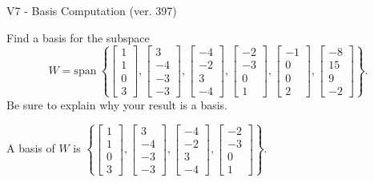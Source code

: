 \begin{exercise}
  \begin{exerciseTitle}V7 - Basis Computation (ver. 397)\end{exerciseTitle}
  \begin{exerciseStatement}
    Find a basis for the subspace 
\[W=\mathrm{span}\ \left\{\left[\begin{array}{r}
1 \\
1 \\
0 \\
3
\end{array}\right] , \left[\begin{array}{r}
3 \\
-4 \\
-3 \\
-3
\end{array}\right] , \left[\begin{array}{r}
-4 \\
-2 \\
3 \\
-4
\end{array}\right] , \left[\begin{array}{r}
-2 \\
-3 \\
0 \\
1
\end{array}\right] , \left[\begin{array}{r}
-1 \\
0 \\
0 \\
2
\end{array}\right] , \left[\begin{array}{r}
-8 \\
15 \\
9 \\
-2
\end{array}\right]\right\}.\]
 Be sure to explain why your result is a basis.


  \end{exerciseStatement}
  \begin{exerciseAnswer}
   A basis of \(W\) is  \(\left\{\left[\begin{array}{r}
1 \\
1 \\
0 \\
3
\end{array}\right] , \left[\begin{array}{r}
3 \\
-4 \\
-3 \\
-3
\end{array}\right] , \left[\begin{array}{r}
-4 \\
-2 \\
3 \\
-4
\end{array}\right] , \left[\begin{array}{r}
-2 \\
-3 \\
0 \\
1
\end{array}\right]\right\}\).
  


  \end{exerciseAnswer}
\end{exercise}